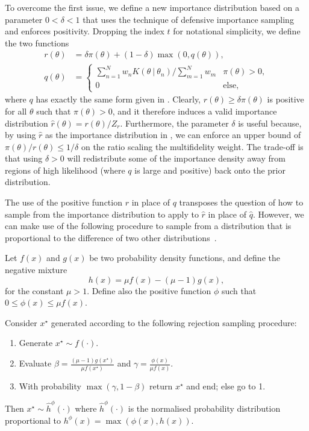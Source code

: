 \documentclass[review]{siamonline190516}
\begin{document}
To overcome the first issue, we define a new importance distribution based on a parameter $0<\delta<1$ that uses the technique of defensive importance sampling~\cite{Owen2013} and enforces positivity.
Dropping the index $t$ for notational simplicity, we define the two functions
\begin{subequations}
\label{eq:DefensiveImportance}
\begin{align}
 r(\theta) &= \delta \pi(\theta) + (1-\delta) \max\left( 0, q(\theta) \right),
 \\
 q(\theta) &= \begin{cases}
                      \sum_{n=1}^{N} w_n K(\theta ~|~ \theta_n) \big/ \sum_{m=1}^{N} w_m & \pi(\theta)>0, 
                      \\
                      0 & \text{else,}
                    \end{cases}
\end{align}
\end{subequations}
where $q$ has exactly the same form given in .
Clearly, $r(\theta) \geq \delta \pi(\theta)$ is positive for all $\theta$ such that $\pi(\theta)>0$, and it therefore induces a valid importance distribution $\hat r(\theta) = r(\theta)/Z_r$.
Furthermore, the parameter $\delta$ is useful because, by using $\hat r$ as the importance distribution in , we can enforce an upper bound of $\pi(\theta)/r(\theta) \leq 1/\delta$ on the ratio scaling the multifidelity weight.
The trade-off is that using $\delta>0$ will redistribute some of the importance density away from regions of high likelihood (where $q$ is large and positive) back onto the prior distribution.

The use of the positive function $r$ in place of $q$ transposes the question of how to sample from the importance distribution to apply to $\hat r$ in place of $\hat q$.
However, we can make use of the following procedure to sample from a distribution that is proportional to the difference of two other distributions~\cite{Rabusseau2014}.

\begin{lemma}
\label{negmix}
Let $f(x)$ and $g(x)$ be two probability density functions, and define the negative mixture
\[
 h(x) = \mu f(x) - (\mu - 1) g(x),
\]
for the constant $\mu > 1$. 
Define also the positive function $\phi$ such that $0 \leq \phi(x) \leq \mu f(x)$. 

Consider $x^\star$ generated according to the following rejection sampling procedure:
\begin{enumerate}
 \item Generate $x^\star \sim f(\cdot)$.
 \item Evaluate $\beta = \frac{(\mu-1)g(x^\star)}{\mu f(x^\star)}$ and $\gamma = \frac{\phi(x)}{\mu f(x)}$.
 \item With probability $\max(\gamma, 1-\beta)$ return $x^\star$ and end; else go to 1.
\end{enumerate}
Then $x^\star \sim \hat h^\phi(\cdot)$ where $\hat h^\phi(\cdot)$ is the normalised probability distribution proportional to $h^\phi(x) = \max(\phi(x), h(x))$.
\end{lemma}
\end{document}
